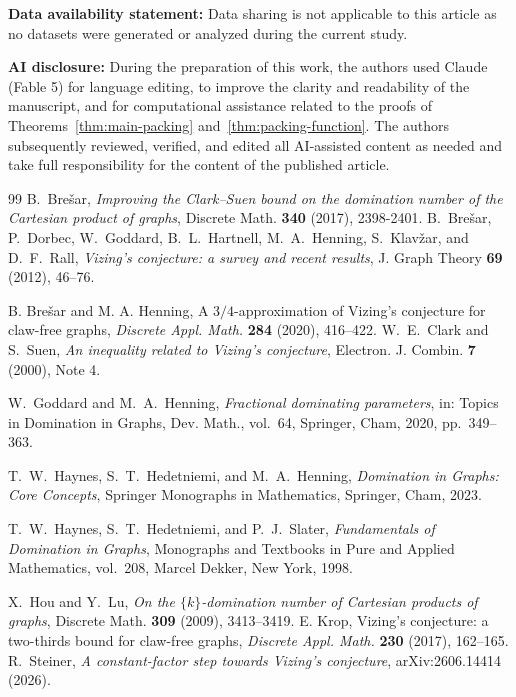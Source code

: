 \documentclass[10pt]{amsart}
\theoremstyle{remark}
\begin{document}
\medskip
\noindent \textbf{\small Data availability statement:} {\small Data sharing is not applicable to this article as no datasets were generated or analyzed during the current study.}
\medskip

\noindent \textbf{\small AI disclosure:} During the preparation of this work, the authors used Claude (Fable 5) for language editing, to improve the clarity and readability of the manuscript, and for computational assistance related to the proofs of Theorems~\ref{thm:main-packing} and~\ref{thm:packing-function}. The authors subsequently reviewed, verified, and edited all AI-assisted content as needed and take full responsibility for the content of the published article.


\begin{thebibliography}{99}
B.~Bre\v{s}ar,
\emph{Improving the Clark--Suen bound on the domination number of the
Cartesian product of graphs},
Discrete Math. \textbf{340} (2017), 2398-2401.
B.~Bre\v{s}ar, P.~Dorbec, W.~Goddard, B.~L.~Hartnell, M.~A.~Henning,
S.~Klav\v{z}ar, and D.~F.~Rall,
\emph{Vizing's conjecture: a survey and recent results},
J. Graph Theory \textbf{69} (2012), 46--76.


B. Bre\v{s}ar and M. A. Henning,
A $3/4$-approximation of Vizing's conjecture for claw-free graphs,
\emph{Discrete Appl. Math.} \textbf{284} (2020), 416--422.
W.~E.~Clark and S.~Suen,
\emph{An inequality related to Vizing's conjecture},
Electron. J. Combin. \textbf{7} (2000), Note 4.

W.~Goddard and M.~A.~Henning,
\emph{Fractional dominating parameters}, in:
Topics in Domination in Graphs, Dev. Math., vol.~64, Springer, Cham, 2020,
pp.~349--363.

T.~W.~Haynes, S.~T.~Hedetniemi, and M.~A.~Henning,
\emph{Domination in Graphs: Core Concepts},
Springer Monographs in Mathematics, Springer, Cham, 2023.

T.~W.~Haynes, S.~T.~Hedetniemi, and P.~J.~Slater,
\emph{Fundamentals of Domination in Graphs},
Monographs and Textbooks in Pure and Applied Mathematics, vol.~208,
Marcel Dekker, New York, 1998.

X.~Hou and Y.~Lu,
\emph{On the $\{k\}$-domination number of Cartesian products of graphs},
Discrete Math. \textbf{309} (2009), 3413--3419.
E. Krop,
Vizing's conjecture: a two-thirds bound for claw-free graphs,
\emph{Discrete Appl. Math.} \textbf{230} (2017), 162--165.
R.~Steiner,
\emph{A constant-factor step towards Vizing's conjecture},
arXiv:2606.14414 (2026).


\end{thebibliography}
\end{document}
